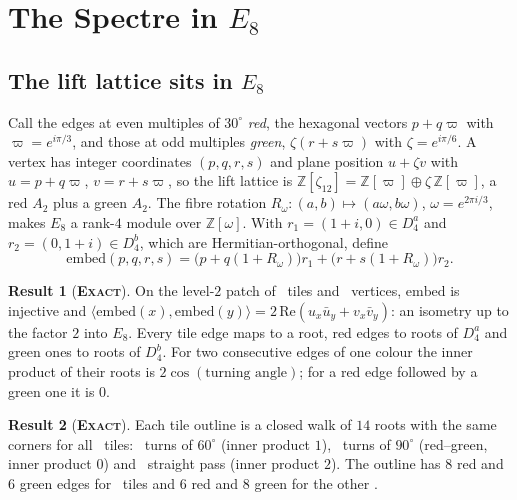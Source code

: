 \documentclass[11pt]{article}
\newcommand{\exact}{\textbf{\textsc{Exact}}}
\theoremstyle{definition}
\newtheorem{result}{Result}
\begin{document}

\section{The Spectre in \texorpdfstring{$E_8$}{E8}}\label{sec:tiles}
\subsection{The lift lattice sits in \texorpdfstring{$E_8$}{E8}}\label{sec:embed}
Call the edges at even multiples of $30^\circ$ \emph{red}, the hexagonal vectors $p+q\varpi$ with $\varpi=e^{i\pi/3}$, and those at odd multiples \emph{green}, $\zeta(r+s\varpi)$ with $\zeta=e^{i\pi/6}$. A vertex has integer coordinates $(p,q,r,s)$ and plane position $u+\zeta v$ with $u=p+q\varpi$, $v=r+s\varpi$, so the lift lattice is $\mathbb{Z}[\zeta_{12}]=\mathbb{Z}[\varpi]\oplus\zeta\,\mathbb{Z}[\varpi]$, a red $A_2$ plus a green $A_2$. The fibre rotation $R_\omega:(a,b)\mapsto(a\omega,b\omega)$, $\omega=e^{2\pi i/3}$, makes $E_8$ a rank-$4$ module over $\mathbb{Z}[\omega]$. With $r_1=(1+i,0)\in D_4^a$ and $r_2=(0,1+i)\in D_4^b$, which are Hermitian-orthogonal, define
\[
\mathrm{embed}(p,q,r,s)=\bigl(p+q(1+R_\omega)\bigr)r_1+\bigl(r+s(1+R_\omega)\bigr)r_2 .
\]
\begin{result}[\exact]\label{res:embed}
On the level-$2$ patch of \qgTiles\ tiles and \qgVertices\ vertices, $\mathrm{embed}$ is injective and $\langle\mathrm{embed}(x),\mathrm{embed}(y)\rangle=2\,\mathrm{Re}(u_x\bar u_y+v_x\bar v_y)$: an isometry up to the factor $2$ into $E_8$. Every tile edge maps to a root, red edges to roots of $D_4^a$ and green ones to roots of $D_4^b$. For two consecutive edges of one colour the inner product of their roots is $2\cos(\text{turning angle})$; for a red edge followed by a green one it is $0$.
\end{result}
\begin{result}[\exact]\label{res:corners}
Each tile outline is a closed walk of $14$ roots with the same corners for all \qgTiles\ tiles: \qgCornersSixty\ turns of $60^\circ$ (inner product $1$), \qgCornersNinety\ turns of $90^\circ$ (red--green, inner product $0$) and \qgCornersStraight\ straight pass (inner product $2$). The outline has $8$ red and $6$ green edges for \qgTilesMajor\ tiles and $6$ red and $8$ green for the other \qgTilesMinor.
\end{result}
\end{document}
